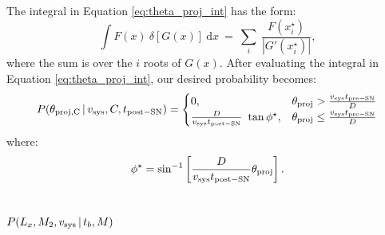 \documentclass[12pt, preprint]{aastex}
\newcommand{\given}{\,|\,}
\newcommand{\dd}{\mathrm{d}}
\begin{document}
The integral in Equation \ref{eq:theta_proj_int} has the form:
\begin{equation}
\int F(x)\ \delta \left[ G(x) \right]\ \dd x\ =\ \sum_i\ \frac{F(x_i^{\star})}{| G' (x_i^{\star}) |},
\end{equation}
where the sum is over the $i$ roots of $G(x)$. After evaluating the integral in Equation \ref{eq:theta_proj_int}, our desired probability becomes:
\begin{equation}
  P(\theta_{\rm proj, C} \given v_{\rm sys}, C, t_{\rm post-SN}) =
\begin{cases} 
      0, & \theta_{\rm proj} > \frac{v_{\rm sys}t_{\rm pre-SN}}{D} \\
      \frac{D}{v_{\rm sys} t_{\rm post-SN}}\ \tan \phi^{\star}, & \theta_{\rm proj} \leq \frac{v_{\rm sys}t_{\rm pre-SN}}{D} 
   \end{cases}
\end{equation}
where:
\begin{equation}
\phi^{\star} = \sin^{-1} \left[ \frac{D}{v_{\rm sys} t_{\rm post-SN}} \theta_{\rm proj} \right].
\end{equation}








\subsection{$P(L_x, M_2, v_{\rm sys} \given t_b, M)$}
\end{document}
